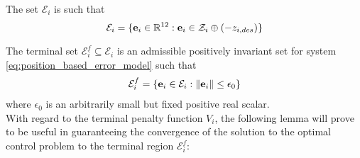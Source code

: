 The set $\mathcal{E}_i$ is such that
$$\mathcal{E}_i = \{\bm{\mathbf{e}}_i \in \mathbb{R}^{12} : \bm{\mathbf{e}}_i \in \mathcal{Z}_i \oplus (-z_{i,des} )\}$$

The terminal set $\mathcal{E}_i^f \subseteq \mathcal{E}_i$ is an admissible
positively invariant set  for system
\eqref{eq:position_based_error_model} such that
\begin{align}
  \mathcal{E}_i^f = \{\bm{\mathbf{e}}_i \in \mathcal{E}_i : \|\bm{\mathbf{e}}_i\| \leq \epsilon_0 \}
\end{align}
where $\epsilon_0$ is an arbitrarily small but fixed positive real scalar.\\

With regard to the terminal penalty function $V_i$, the following lemma will
prove to be useful in guaranteeing the convergence of the solution to the
optimal control problem to the terminal region $\mathcal{E}_i^f$:

